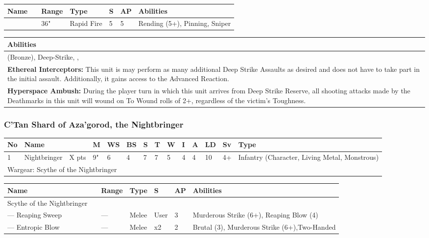 \noindent
\begin{tabular}{||m{140pt} m{00pt} m{31pt} m{55pt} m{12pt} m{12pt} m{210pt}||}
	\hline
	Name & & Range & Type & S & AP & Abilities \\
	\hline
	\quickref{Synaptic Disintegrator} &  & 36" & Rapid Fire & 5 & 5 & Rending (5+), Pinning, Sniper \\
	\hline
\end{tabular}

\noindent
\begin{tabular}{||m{532pt}||}
	\hline
	Abilities \\
	\hline
	\quickref{Awakening Protocols} (Bronze), Deep-Strike, \quickref{Hyperspace Hunters}, \quickref{Reanimation Protocols} \\
	\textbf{Ethereal Interceptors:} This unit is may perform as many additional Deep Strike Assaults as desired and does not have to take part in the initial assault. Additionally, it gains access to the \quickref{Ethereal Interception} Advanced Reaction. \\
	\textbf{Hyperspace Ambush:} During the player turn in which this unit arrives from Deep Strike Reserve, all shooting attacks made by the Deathmarks in this unit will wound on To Wound rolls of 2+, regardless of the victim’s Toughness. \\
	\hline
\end{tabular}


\newpage
\subsubsection{C'Tan Shard of Aza'gorod, the Nightbringer}

\noindent
\begin{tabular}{||m{10pt} m{90pt} m{30pt} m{11pt} m{11pt} m{11pt} m{11pt} m{11pt} m{11pt} m{11pt} m{11pt} m{11pt} m{11pt} m{135pt}||}
	\hline
	No & Name & & M & WS & BS & S & T & W & I & A & LD & Sv & Type \\
	\hline
	1 & Nightbringer & X pts & 9" & 6 & 4 & 7 & 7 & 5 & 4 & 4 & 10 & 4+ & Infantry (Character, Living Metal, Monstrous)\\
	\hline
	\hline
	\multicolumn{14}{||Z{532 pt}||}{Wargear: Scythe of the Nightbringer}\\
	\hline
\end{tabular}

\noindent
\begin{tabular}{||m{140pt} m{0pt} m{31pt} m{55pt} m{12pt} m{12pt} m{210pt}||}
	\hline
	Name & & Range & Type & S & AP & Abilities \\
	\hline
	Scythe of the Nightbringer & & & & & & \\
	— Reaping Sweep &  & — & Melee & User & 3 & Murderous Strike (6+), Reaping Blow (4) \\
	— Entropic Blow &  & — & Melee & x2 & 2 & Brutal (3), Murderous Strike (6+),Two-Handed \\
	\hline
\end{tabular}

